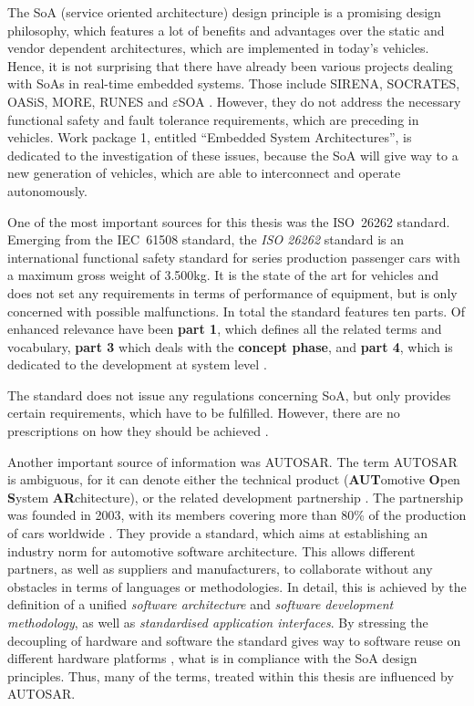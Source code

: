 \label{ch:introduction}
The SoA (service oriented architecture) design principle is a promising design philosophy, which features a lot of benefits and advantages over the static and vendor dependent architectures, which are implemented in today's vehicles. Hence, it is not surprising that there have already been various projects dealing with SoAs in real-time embedded systems. Those include SIRENA, SOCRATES, OASiS, MORE, RUNES and $\varepsilon$SOA \cite{scholz} \cite{sommer} \cite{buckl}. However, they do not address the necessary functional safety and fault tolerance requirements, which are preceding in vehicles. Work package 1, entitled ``Embedded System Architectures'', is dedicated to the investigation of these issues, because the SoA will give way to a new generation of vehicles, which are able to interconnect and operate autonomously.

One of the most important sources for this thesis was the \mbox{ISO 26262} standard. Emerging from the \mbox{IEC 61508} standard, the \emph{ISO 26262} standard is an international functional safety standard for series production passenger cars with a maximum gross weight of 3.500kg. It is the state of the art for vehicles and does not set any requirements in terms of performance of equipment, but is only concerned with possible malfunctions. In total the standard features ten parts. Of enhanced relevance have been \textbf{part 1}, which defines all the related terms and vocabulary, \textbf{part 3} which deals with the \textbf{concept phase}, and \textbf{part 4}, which is dedicated  to the development at system level \cite{iso26262:1} \cite{iso26262:3} \cite{iso26262:4}.

The standard does not issue any regulations concerning SoA, but only provides certain requirements, which have to be fulfilled. However, there are no prescriptions on how they should be achieved \cite{iso26262:course1}.

Another important source of information was AUTOSAR. The term AUTOSAR is ambiguous, for it can denote either the technical product (\textbf{AUT}omotive \textbf{O}pen \textbf{S}ystem \textbf{AR}chitecture), or the related development partnership \cite{autosar_rs_main}. The partnership was founded in 2003, with its members covering more than 80\% of the production of cars worldwide \cite{kirschke_biller2011} \cite{schmerler2012}. They provide a standard, which aims at establishing an industry norm for automotive software architecture. This allows different partners, as well as suppliers and manufacturers, to collaborate without any obstacles in terms of languages or methodologies. In detail, this is achieved by the definition of a unified \emph{software architecture} and \emph{software development methodology}, as well as \emph{standardised application interfaces}. By stressing the decoupling of hardware and software the standard gives way to software reuse on different hardware platforms \cite{kirschke_biller2011} \cite{schmerler2012}, what is in compliance with the SoA design principles. Thus, many of the terms, treated within this thesis are influenced by AUTOSAR.

